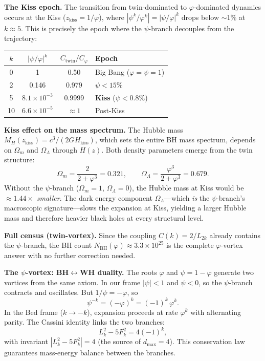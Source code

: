 \documentclass[12pt,a4paper]{article}
\begin{document}
\textbf{The Kiss epoch.}\;  The transition from twin-dominated to $\varphi$-dominated dynamics occurs at the Kiss ($z_{\mathrm{kiss}} = 1/\varphi$), where $|\psi^k/\varphi^k| = |\psi/\varphi|^k$ drops below $\sim 1\%$ at $k \approx 5$.  This is precisely the epoch where the $\psi$-branch decouples from the trajectory:

\begin{center}
\begin{tabular}{c|c|c|l}
$k$ & $|\psi/\varphi|^k$ & $C_{\mathrm{twin}}/C_\varphi$ & Epoch \\\hline
0 & 1 & 0.50 & Big Bang ($\varphi = \psi = 1$) \\
2 & 0.146 & 0.979 & $\psi < 15\%$ \\
5 & $8.1 \times 10^{-3}$ & 0.9999 & \textbf{Kiss} ($\psi < 0.8\%$) \\
10 & $6.6 \times 10^{-5}$ & $\approx 1$ & Post-Kiss
\end{tabular}
\end{center}

\textbf{Kiss effect on the mass spectrum.}\;  The Hubble mass $M_H(z_{\mathrm{kiss}}) = c^3/(2GH_{\mathrm{kiss}})$, which sets the entire BH mass spectrum, depends on $\Omega_m$ and $\Omega_\Lambda$ through $H(z)$.  Both density parameters emerge from the twin structure:
\begin{equation}
\Omega_m = \frac{2}{2 + \varphi^3} = 0.321, \qquad \Omega_\Lambda = \frac{\varphi^3}{2 + \varphi^3} = 0.679.
\end{equation}
Without the $\psi$-branch ($\Omega_m = 1$, $\Omega_\Lambda = 0$), the Hubble mass at Kiss would be $\approx 1.44\times$ \emph{smaller}.  The dark energy component $\Omega_\Lambda$---which \emph{is} the $\psi$-branch's macroscopic signature---slows the expansion at Kiss, yielding a larger Hubble mass and therefore heavier black holes at every structural level.

\textbf{Full census (twin-vortex).}\;  Since the coupling $C(k) = 2/L_{2k}$ already contains the $\psi$-branch, the BH count $N_{\mathrm{BH}}(\varphi) \approx 3.3 \times 10^{25}$ is the complete $\varphi$-vortex answer with no further correction needed.

\textbf{The $\psi$-vortex: BH$\leftrightarrow$WH duality.}\;  The roots $\varphi$ and $\psi = 1 - \varphi$ generate two vortices from the same axiom.  In our frame $|\psi| < 1$ and $\psi < 0$, so the $\psi$-branch contracts and oscillates.  But $1/\psi = -\varphi$, so
\[
\psi^{-k} = (-\varphi)^k = (-1)^k\,\varphi^k.
\]
In the Bed frame ($k \to -k$), expansion proceeds at rate $\varphi^k$ with alternating parity.  The Cassini identity links the two branches:
\begin{equation}
L_k^2 - 5F_k^2 = 4(-1)^k,
\end{equation}
with invariant $|L_k^2 - 5F_k^2| = 4$ (the source of $d_{\max} = 4$).  This conservation law guarantees mass-energy balance between the branches.
\end{document}
